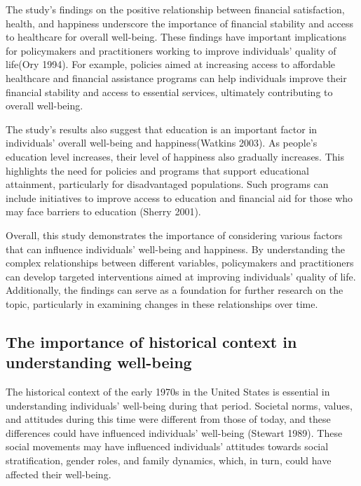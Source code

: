 \documentclass[
  letterpaper,
  DIV=11,
  numbers=noendperiod]{scrartcl}
\begin{document}
The study's findings on the positive relationship between financial
satisfaction, health, and happiness underscore the importance of
financial stability and access to healthcare for overall well-being.
These findings have important implications for policymakers and
practitioners working to improve individuals' quality of life(Ory 1994).
For example, policies aimed at increasing access to affordable
healthcare and financial assistance programs can help individuals
improve their financial stability and access to essential services,
ultimately contributing to overall well-being.

The study's results also suggest that education is an important factor
in individuals' overall well-being and happiness(Watkins 2003). As
people's education level increases, their level of happiness also
gradually increases. This highlights the need for policies and programs
that support educational attainment, particularly for disadvantaged
populations. Such programs can include initiatives to improve access to
education and financial aid for those who may face barriers to education
(Sherry 2001).

Overall, this study demonstrates the importance of considering various
factors that can influence individuals' well-being and happiness. By
understanding the complex relationships between different variables,
policymakers and practitioners can develop targeted interventions aimed
at improving individuals' quality of life. Additionally, the findings
can serve as a foundation for further research on the topic,
particularly in examining changes in these relationships over time.

\hypertarget{the-importance-of-historical-context-in-understanding-well-being}{%
\subsection{The importance of historical context in understanding
well-being}\label{the-importance-of-historical-context-in-understanding-well-being}}

The historical context of the early 1970s in the United States is
essential in understanding individuals' well-being during that period.
Societal norms, values, and attitudes during this time were different
from those of today, and these differences could have influenced
individuals' well-being (Stewart 1989). These social movements may have
influenced individuals' attitudes towards social stratification, gender
roles, and family dynamics, which, in turn, could have affected their
well-being.
\end{document}
